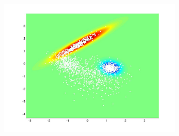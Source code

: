 \documentclass[useAMS,usenatbib,fleqn]{mn2e}
\begin{document}
\begin{figure}
\begin{subfigure}[b]{70 px}
                \includegraphics[trim = 150px 100px 150px 70px, clip=true,width=\textwidth]{VC2.jpg}
        \end{subfigure}
       

\end{figure}
\end{document}
